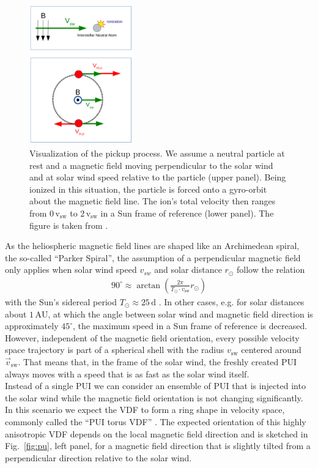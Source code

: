 \begin{figure}[h]
	\includegraphics[width=0.4\textwidth]{Figures/pu_process_1_2.png}
	\centering
	\caption{Visualization of the pickup process. We assume a neutral particle at rest and a magnetic field moving perpendicular to the solar wind and at solar wind speed relative to the particle (upper panel). Being ionized in this situation, the particle is forced onto a gyro-orbit about the magnetic field line. The ion's total velocity then ranges from $0\, \mathrm{v_{\mathrm{sw}}} $ to $2 \, \mathrm{v_{\mathrm{sw}}}$ in a Sun frame of reference (lower panel). The figure is taken from \citet{talk_etss}.}
	\label{fig:pu_proc}
\end{figure}
As the heliospheric magnetic field lines are shaped like an Archimedean spiral, the so-called ``Parker Spiral'', the assumption of a perpendicular magnetic field only applies when solar wind speed $v_{sw}$ and solar distance $r_\odot$ follow the relation
\begin{align*}
90 ^\circ \approx  \arctan \left( \frac{2\pi}{T_\odot \cdot v_{\mathrm{sw}}} r_\odot \right)
\end{align*}
with the Sun's sidereal period $T_\odot \approx 25\,\mathrm{d}$ \citep{prlss_2004}.
In other cases, e.g. for solar distances about $1\,\mathrm{AU}$, at which the angle between solar wind and magnetic field direction is approximately $45^\circ$, the maximum speed in a Sun frame of reference is decreased.
However, independent of the magnetic field orientation, every possible velocity space trajectory is part of a spherical shell with the radius $v_{\mathrm{sw}}$ centered around $\vec{v}_{\mathrm{sw}}$. That means that, in the frame of the solar wind, the freshly created PUI always moves with a speed that is as fast as the solar wind itself.
\\
Instead of a single PUI we can consider an ensemble of PUI that is injected into the solar wind while the magnetic field orientation is not changing significantly. In this scenario we expect the VDF to form a ring shape in velocity space, commonly called the ``PUI torus VDF'' \citep{oka_2002}. The expected orientation of this highly anisotropic VDF depends on the local magnetic field direction and is sketched in Fig.~\ref{fig:pu}, left panel, for a magnetic field direction that is slightly tilted from a perpendicular direction relative to the solar wind.
